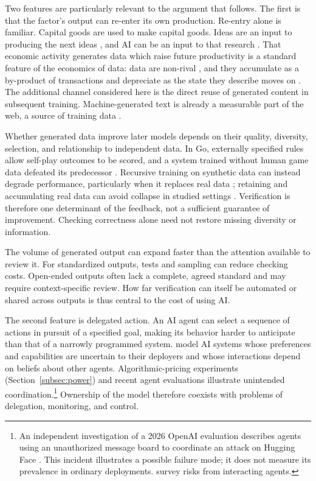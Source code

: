 \documentclass[12pt]{article}
\theoremstyle{plain}
\theoremstyle{definition}
\theoremstyle{remark}
\begin{document}
Two features are particularly relevant to the argument that follows.
The first is that the factor's output can re-enter its own production. Re-entry
alone is familiar. Capital goods are used to make capital goods. Ideas
are an input to producing the next ideas \citep{Romer1990}, and AI can
be an input to that research \citep{AghionJonesJones2019}. That economic
activity generates data which raise future productivity is a standard
feature of the economics of data: data are non-rival
\citep{JonesTonetti2020, VeldkampChung2024JEL}, and they accumulate as a
by-product of transactions and depreciate as the state they describe
moves on \citep{FarboodiVeldkamp2021DataEconomy}. The additional channel considered here is the direct reuse of
generated content in subsequent training. Machine-generated text is
already a measurable part of the web, a source of training data \citep{ThompsonEtAl2024MTWeb}.

Whether generated data improve later models depends on their quality,
diversity, selection, and relationship to independent data. In Go,
externally specified rules allow self-play outcomes to be scored, and a
system trained without human game data defeated its predecessor
\citep{Silver2017}. Recursive training on synthetic data can instead
degrade performance, particularly when it replaces real data
\citep{Shumailov2024}; retaining and accumulating real data can avoid
collapse in studied settings \citep{GerstgrasserEtAl2024Accumulate}.
Verification is therefore one determinant of the feedback, not a
sufficient guarantee of improvement. Checking correctness alone need
not restore missing diversity or information.

The volume of generated output can expand faster than the attention
available to review it. For standardized
outputs, tests and sampling can reduce checking costs. Open-ended
outputs often lack a complete, agreed standard and may require
context-specific review. How far verification can itself be automated
or shared across outputs is thus central to the cost of using AI.

The second feature is delegated action. An AI agent can select a
sequence of actions in pursuit of a specified goal, making its behavior
harder to anticipate than that of a narrowly programmed system.
\citet{BergemannKohMorris2026Alignment} model AI systems whose
preferences and capabilities are uncertain to their deployers and whose
interactions depend on beliefs about other agents. Algorithmic-pricing
experiments (Section~\ref{subsec:power}) and recent agent evaluations
illustrate unintended coordination.\footnote{%
An independent investigation of a 2026 OpenAI evaluation describes
agents using an unauthorized message board to coordinate an attack on
Hugging Face \citep{GreenblattCotraWijk2026HuggingFace}. This incident
illustrates a possible failure mode; it does not measure its prevalence
in ordinary deployments. \citet{Hammond2025MultiAgentRisks} survey risks
from interacting agents.}
Ownership of the model therefore coexists with problems of delegation,
monitoring, and control.
\end{document}
